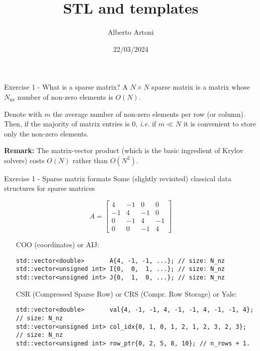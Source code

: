 \documentclass[10pt,aspectratio=169]{beamer}
\begin{document}
    \title{STL and templates}
    \author{Alberto Artoni}
    \date{22/03/2024}

\begin{frame}
    \maketitle
\end{frame}


\begin{frame}{Exercise 1 - What is a sparse matrix?} A $N\times N$ sparse matrix is a matrix whose $N_\text{nz}$ number of non-zero elements  is $O(N)$. \\
	\medskip
	
Denote with $m$ the average number of non-zero elements per row (or column). \\
Then, if the majority of matrix entries is $0$, {\it i.e.} if $m \ll N$ it is convenient to store only the non-zero elements. \medskip

\textbf{Remark:} The matrix-vector product (which is the basic ingredient of Krylov solvers) costs $O(N)$ rather than $O(N^{2})$.



\end{frame}

\begin{frame}[fragile]{Exercise 1 - Sparse matrix formats}
Some (slightly revisited) classical data structures for sparse matrices

\begin{equation*}
A = 
\begin{bmatrix}
4  & -1 & 0  & 0\\
-1 &  4 & -1 & 0\\
0  & -1 &  4 & -1\\
0  &  0 &  -1& 4
\end{bmatrix}
\end{equation*}

\begin{itemize}
\item [COO] (coordinates) or AIJ: \tiny
\begin{lstlisting}
std::vector<double>       A{4, -1, -1, ...}; // size: N_nz
std::vector<unsigned int> I{0,  0,  1, ...}; // size: N_nz
std::vector<unsigned int> J{0,  1,  0, ...}; // size: N_nz
\end{lstlisting} \normalsize
\item [CSR] (Compressed Sparse Row) or CRS (Compr. Row Storage) or Yale:\tiny
\begin{lstlisting}
std::vector<double>       val{4, -1, -1, 4, -1, -1, 4, -1, -1, 4};  // size: N_nz
std::vector<unsigned int> col_idx{0, 1, 0, 1, 2, 1, 2, 3, 2, 3};  // size: N_nz
std::vector<unsigned int> row_ptr{0, 2, 5, 8, 10}; // n_rows + 1.
\end{lstlisting} 
\end{itemize}
\end{frame}
\end{document}

